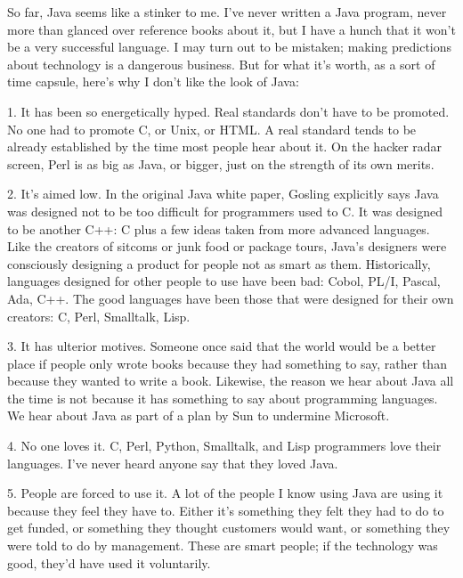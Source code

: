 So far, Java seems
                  like a stinker to me. I've never written a Java program, never
                  more than glanced over reference books about it, but I have a
                  hunch that it won't be a very successful language. I may turn
                  out to be mistaken; making predictions about technology is a
                  dangerous business. But for what it's worth, as a sort of time
                  capsule, here's why I don't like the look of Java:


                  1. It has been so energetically hyped. Real standards don't
                  have to be promoted. No one had to promote C, or Unix, or
                  HTML. A real standard tends to be already established by the
                  time most people hear about it. On the hacker radar screen,
                  Perl is as big as Java, or bigger, just on the strength of its
                  own merits.

2. It's aimed low. In the original Java
                  white paper, Gosling explicitly says Java was designed not to
                  be too difficult for programmers used to C. It was designed to
                  be another C++: C plus a few ideas taken from more advanced
                  languages. Like the creators of sitcoms or junk food or
                  package tours, Java's designers were consciously designing a
                  product for people not as smart as them. Historically,
                  languages designed for other people to use have been bad:
                  Cobol, PL/I, Pascal, Ada, C++. The good languages have been
                  those that were designed for their own creators: C, Perl,
                  Smalltalk, Lisp.

3. It has ulterior motives.
                  Someone once said that the world would be a better place if
                  people only wrote books because they had something to say,
                  rather than because they wanted to write a book. Likewise, the
                  reason we hear about Java all the time is not because it has
                  something to say about programming languages. We hear about
                  Java as part of a plan by Sun to undermine Microsoft.

4.
                  No one loves it. C, Perl, Python, Smalltalk, and Lisp
                  programmers love their languages. I've never heard anyone say
                  that they loved Java.

5. People are forced to use
                  it. A lot of the people I know using Java are using it because
                  they feel they have to. Either it's something they felt they
                  had to do to get funded, or something they thought customers
                  would want, or something they were told to do by management.
                  These are smart people; if the technology was good, they'd
                  have used it voluntarily.

